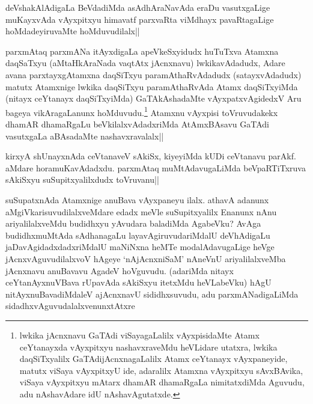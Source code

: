 
\begin{artha}
deVshakAlAdigaLa BeVdadiMda asAdhAraNavAda eraDu vasutxgaLige muKayxvAda vAyxpitxyu himavatf parxvaRta viMdhayx pavaRtagaLige hoMdadeyiruvaMte hoMduvudilalx||
\end{artha}

\begin{artha}%
parxmAtaq parxmANa itAyxdigaLa apeVkeSxyidudx huTuTxva Atamxna daqSaTxyu (aMtaHkAraNada vaqtAtx jAcnxnavu) lwkikavAdadudx, Adare avana parxtayxgAtamxna daqSiTxyu paramAthaRvAdadudx (satayxvAdadudx) matutx Atamxnige lwkika daqSiTxyu paramAthaRvAda Atamx daqSiTxyiMda (nitayx ceYtanayx daqSiTxyiMda) GaTAkAshadaMte vAyxpatxvAgidedxV Aru bageya vikAragaLanunx hoMduvudu.\footnote[1]{lwkika jAcnxnavu GaTAdi viSayagaLalilx vAyxpisidaMte Atamx ceYtanayxda vAyxpitxyu nashavxraveMdu heVLidare utatxra, lwkika daqSiTxyalilx GaTAdijAcnxnagaLalilx Atamx ceYtanayx vAyxpaneyide, matutx viSaya vAyxpitxyU ide, adaralilx Atamxna vAyxpitxyu sAvxBAvika, viSaya vAyxpitxyu mAtarx dhamAR dhamaRgaLa nimitatxdiMda Aguvudu, adu nAshavAdare idU nAshavAgutatxde.} Atamxnu vAyxpisi toVruvudakekx dhamAR dhamaRgaLu beVkilalxvAdadxriMda AtAmxBAsavu GaTAdi vasutxgaLa aBAsadaMte nashavxravalalx|| 
\end{artha}


\begin{artha}
kirxyA shUnayxnAda ceVtanaveV sAkiSx, kiyeyiMda kUDi ceVtanavu parAkf. aMdare horamuKavAdadxdu. parxmAtaq muMtAdavugaLiMda beVpaRTiTxruva sAkiSxyu suSupitxyalilxdudx toVruvanu||
\end{artha}


\begin{artha}
suSupatxnAda Atamxnige anuBava vAyxpaneyu ilalx. athavA adanunx aMgiVkarisuvudilalxveMdare edadx meVle suSupitxyalilx Enanunx nAnu ariyalilalxveMdu budidhxyu yAvudara baladiMda AgabeVku? AvAga budidhxmuMtAda sAdhanagaLu layavAgiruvudariMdalU deVhAdigaLu jaDavAgidadxdadxriMdalU maNiNxna heMTe modalAdavugaLige heVge jAcnxvAguvudilalxvoV hAgeye `nAjAcnxniSaM' nAneVnU ariyalilalxveMba jAcnxnavu anuBavavu AgadeV hoVguvudu. (adariMda nitayx ceYtanAyxnuVBava rUpavAda sAkiSxyu itetxMdu heVLabeVku) hAgU nitAyxnuBavadiMdaleV ajAcnxnavU sididhxsuvudu, adu parxmANadigaLiMda sidadhxvAguvudalalxvenunxtAtxre
\end{artha}

